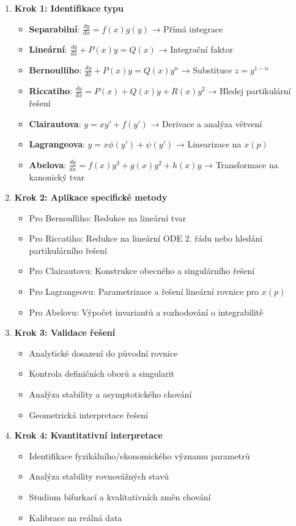 \begin{enumerate}
\item \textbf{Krok 1: Identifikace typu}
\begin{itemize}
\item \textbf{Separabilní}: $\frac{dy}{dx} = f(x)g(y)$ → Přímá integrace
\item \textbf{Lineární}: $\frac{dy}{dx} + P(x)y = Q(x)$ → Integrační faktor
\item \textbf{Bernoulliho}: $\frac{dy}{dx} + P(x)y = Q(x)y^n$ → Substituce $z = y^{1-n}$
\item \textbf{Riccatiho}: $\frac{dy}{dx} = P(x) + Q(x)y + R(x)y^2$ → Hledej partikulární řešení
\item \textbf{Clairautova}: $y = xy' + f(y')$ → Derivace a analýza větvení
\item \textbf{Lagrangeova}: $y = x\phi(y') + \psi(y')$ → Linearizace na $x(p)$
\item \textbf{Abelova}: $\frac{dy}{dx} = f(x)y^3 + g(x)y^2 + h(x)y$ → Transformace na kanonický tvar
\end{itemize}

\item \textbf{Krok 2: Aplikace specifické metody}
\begin{itemize}
\item Pro Bernoulliho: Redukce na lineární tvar
\item Pro Riccatiho: Redukce na lineární ODE 2. řádu nebo hledání partikulárního řešení
\item Pro Clairautovu: Konstrukce obecného a singulárního řešení
\item Pro Lagrangeovu: Parametrizace a řešení lineární rovnice pro $x(p)$
\item Pro Abelovu: Výpočet invariantů a rozhodování o integrabilitě
\end{itemize}

\item \textbf{Krok 3: Validace řešení}
\begin{itemize}
\item Analytické dosazení do původní rovnice
\item Kontrola definičních oborů a singularit
\item Analýza stability a asymptotického chování
\item Geometrická interpretace řešení
\end{itemize}

\item \textbf{Krok 4: Kvantitativní interpretace}
\begin{itemize}
\item Identifikace fyzikálního/ekonomického významu parametrů
\item Analýza stability rovnovážných stavů
\item Studium bifurkací a kvalitativních změn chování
\item Kalibrace na reálná data
\end{itemize}
\end{enumerate}

